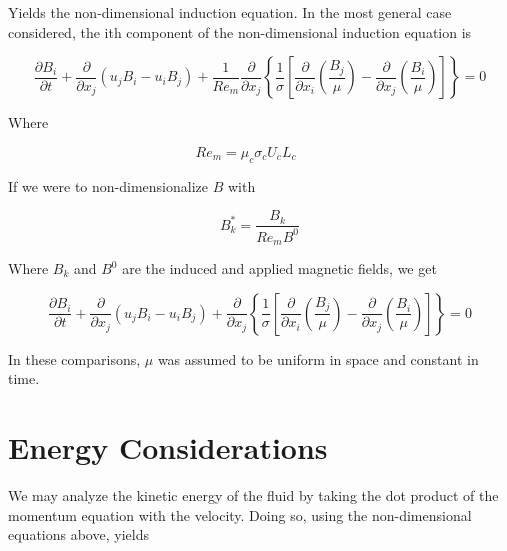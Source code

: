 \documentclass[11pt]{article}
\begin{document}
Yields the non-dimensional induction equation. In the most general case considered, the ith component of the non-dimensional induction equation is

\begin{equation}
	\frac{\partial B_i}{\partial t}
	+ \frac{\partial}{\partial x_j} (u_j B_i - u_i B_j)
	+ \frac{1}{Re_m}
	\frac{\partial}{\partial x_j}
	\left\{ \frac{1}{\sigma}
	\left[
	\frac{\partial}{\partial x_i}
	\left( \frac{B_j}{\mu} \right) -
	\frac{\partial}{\partial x_j}
	\left( \frac{B_i}{\mu} \right)
	\right]
	\right\} = 0
\end{equation}

Where

\begin{equation}
	Re_m = \mu_c \sigma_c U_c L_c \qquad
\end{equation}

If we were to non-dimensionalize $B$ with

\begin{equation}
	B_k^* = \frac{B_k}{Re_m B^0}
\end{equation}

Where $B_k$ and $B^0$ are the induced and applied magnetic fields, we get

\begin{equation}
	\frac{\partial B_i}{\partial t}
	+ \frac{\partial}{\partial x_j} (u_j B_i - u_i B_j)
	+
	\frac{\partial}{\partial x_j}
	\left\{ \frac{1}{\sigma}
	\left[
	\frac{\partial}{\partial x_i}
	\left( \frac{B_j}{\mu} \right) -
	\frac{\partial}{\partial x_j}
	\left( \frac{B_i}{\mu} \right)
	\right]
	\right\} = 0
\end{equation}


In these comparisons, $\mu$ was assumed to be uniform in space and constant in time.


\section{Energy Considerations}
We may analyze the kinetic energy of the fluid by taking the dot product of the momentum equation with the velocity. Doing so, using the non-dimensional equations above, yields
\end{document}
